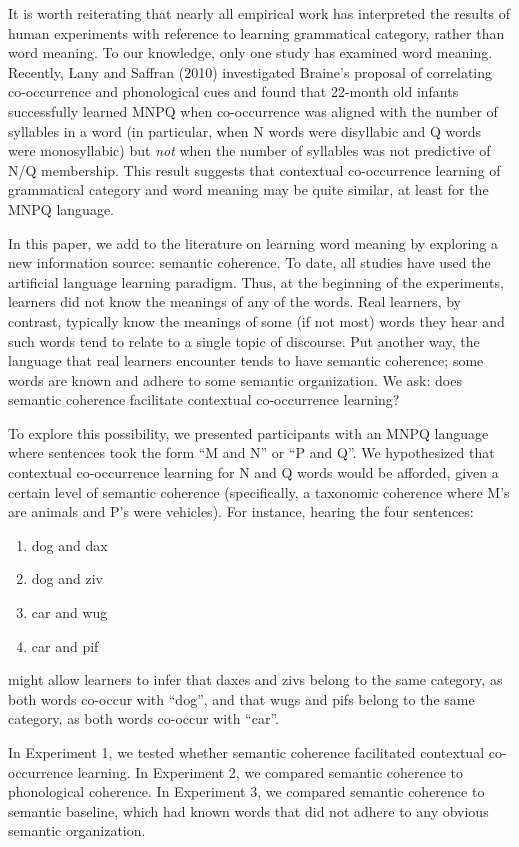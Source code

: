 \documentclass[man,floatsintext]{apa6}
\begin{document}
It is worth reiterating that nearly all empirical work has interpreted the results of human experiments with reference to learning grammatical category, rather than word meaning. To our knowledge, only one study has examined word meaning. Recently, Lany and Saffran (2010) investigated Braine's proposal of correlating co-occurrence and phonological cues and found that 22-month old infants successfully learned MNPQ when co-occurrence was aligned with the number of syllables in a word (in particular, when N words were disyllabic and Q words were monosyllabic) but \emph{not} when the number of syllables was not predictive of N/Q membership. This result suggests that contextual co-occurrence learning of grammatical category and word meaning may be quite similar, at least for the MNPQ language. 

In this paper, we add to the literature on learning word meaning by exploring a new information source: semantic coherence. To date, all studies have used the artificial language learning paradigm. Thus, at the beginning of the experiments, learners did not know the meanings of any of the words. Real learners, by contrast, typically know the meanings of some (if not most) words they hear and such words tend to relate to a single topic of discourse. Put another way, the language that real learners encounter tends to have semantic coherence; some words are known and adhere to some semantic organization. We ask: does semantic coherence facilitate contextual co-occurrence learning?

To explore this possibility, we presented participants with an MNPQ language where sentences took the form ``M and N'' or ``P and Q''. We hypothesized that contextual co-occurrence learning for N and Q words would be afforded, given a certain level of semantic coherence (specifically, a taxonomic coherence where M's are animals and P's were vehicles). For instance, hearing the four sentences:
\begin{enumerate}
\item dog and dax
\item dog and ziv
\item car and wug
\item car and pif
\end{enumerate} might allow learners to infer that daxes and zivs belong to the same category, as both words co-occur with ``dog'', and that wugs and pifs belong to the same category, as both words co-occur with ``car''.

In Experiment 1, we tested whether semantic coherence facilitated contextual co-occurrence learning. In Experiment 2, we compared semantic coherence to phonological coherence. In Experiment 3, we compared semantic coherence to semantic baseline, which had known words that did not adhere to any obvious semantic organization.
\end{document}
